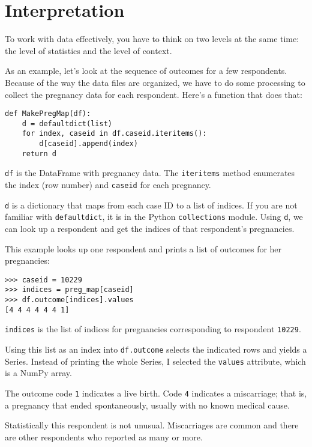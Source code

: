 \section{Interpretation}

To work with data effectively, you have to think on two levels at the
same time: the level of statistics and the level of context.

As an example, let's look at the sequence of outcomes for a few
respondents.  Because of the way the data files are organized, we have
to do some processing to collect the pregnancy data for each respondent.
Here's a function that does that:

\begin{verbatim}
def MakePregMap(df):
    d = defaultdict(list)
    for index, caseid in df.caseid.iteritems():
        d[caseid].append(index)
    return d
\end{verbatim}

{\tt df} is the DataFrame with pregnancy data.  The {\tt iteritems}
method enumerates the index (row number)
and {\tt caseid} for each pregnancy.

{\tt d} is a dictionary that maps from each case ID to a list of
indices.  If you are not familiar with {\tt defaultdict}, it is in
the Python {\tt collections} module.
Using {\tt d}, we can look up a respondent and get the
indices of that respondent's pregnancies.

This example looks up one respondent and prints a list of outcomes
for her pregnancies:

\begin{verbatim}
>>> caseid = 10229
>>> indices = preg_map[caseid]
>>> df.outcome[indices].values
[4 4 4 4 4 4 1]
\end{verbatim}

{\tt indices} is the list of indices for pregnancies corresponding
to respondent {\tt 10229}.

Using this list as an index into {\tt df.outcome} selects the
indicated rows and yields a Series.  Instead of printing the
whole Series, I selected the {\tt values} attribute, which is
a NumPy array.  

The outcome code {\tt 1} indicates a live birth. Code {\tt 4} indicates
a miscarriage; that is, a pregnancy that ended spontaneously, usually
with no known medical cause.

Statistically this respondent is not unusual.  Miscarriages are common
and there are other respondents who reported as many or more.


